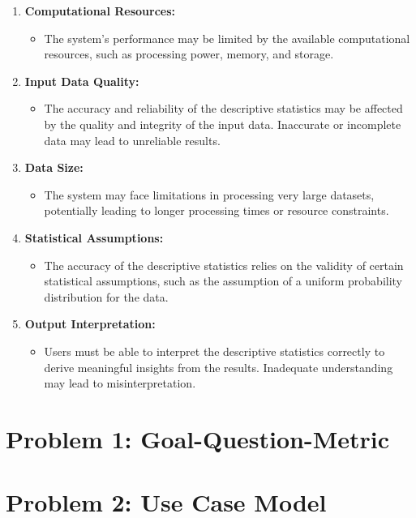 \documentclass[english,12pt,a4paper]{report}
\begin{document}
	\begin{enumerate}
		
	\item \textbf{Computational Resources:} 
	\begin{itemize}
		\item The system's performance may be limited by the available computational resources, such as processing power, memory, and storage.
	\end{itemize}

	\item \textbf{Input Data Quality:} 
	\begin{itemize}
		\item The accuracy and reliability of the descriptive statistics may be affected by the quality and integrity of the input data. Inaccurate or incomplete data may lead to unreliable results.
	\end{itemize}

	\item \textbf{Data Size:} 
	\begin{itemize}
		\item The system may face limitations in processing very large datasets, potentially leading to longer processing times or resource constraints.
	\end{itemize}

	\item \textbf{Statistical Assumptions:} 
	\begin{itemize}
		\item The accuracy of the descriptive statistics relies on the validity of certain statistical assumptions, such as the assumption of a uniform probability distribution for the data.
	\end{itemize}
	
	\item \textbf{Output Interpretation:} 
	\begin{itemize}
		\item Users must be able to interpret the descriptive statistics correctly to derive meaningful insights from the results. Inadequate understanding may lead to misinterpretation.
	\end{itemize}

	\end{enumerate}
	
	\chapter{Problem 1: Goal-Question-Metric}
	
	
	\chapter{Problem 2: Use Case Model}
	
\end{document}

